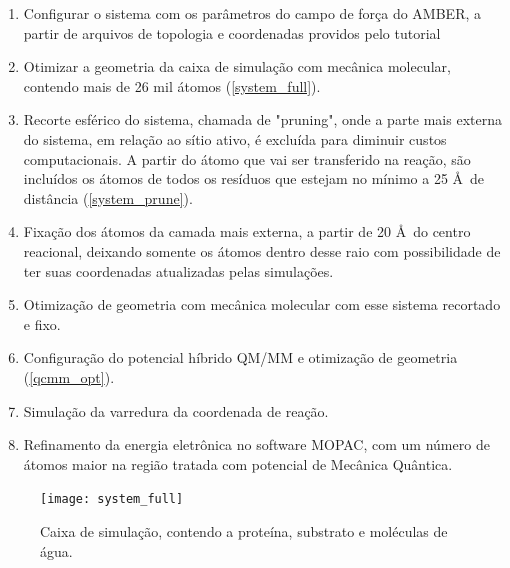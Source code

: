 \documentclass[a4paper,11pt]{refart}
\begin{document}
	\begin{enumerate}
		\item Configurar o sistema com os parâmetros do campo de força do AMBER, a partir de arquivos de topologia e coordenadas providos pelo tutorial
		\item Otimizar a geometria da caixa de simulação com mecânica molecular, contendo mais de 26 mil átomos (\autoref{system_full}). 
		\item Recorte esférico do sistema, chamada de "pruning", onde a parte mais externa do sistema, em relação ao sítio ativo, é excluída para diminuir custos computacionais. A partir do átomo que vai ser transferido na reação, são incluídos os átomos de todos os resíduos que estejam no mínimo a 25 \AA\ de distância (\autoref{system_prune}). 
		\item Fixação dos átomos da camada mais externa, a partir de 20 \AA\ do centro reacional, deixando somente os átomos dentro desse raio com possibilidade de ter suas coordenadas atualizadas pelas simulações. 
		\item Otimização de geometria com mecânica molecular com esse sistema recortado e fixo.
		\item Configuração do potencial híbrido QM/MM e otimização de geometria (\autoref{qcmm_opt}).
		\item Simulação da varredura da coordenada de reação. 
		\item Refinamento da energia eletrônica no software MOPAC, com um número de átomos maior na região tratada com potencial de Mecânica Quântica.		
	\end{enumerate}

	\hspace*{-\leftmarginwidth}
	\begin{minipage}{\fullwidth}
		\begin{figure}[H]
			\begin{center}
				\texttt{[image: system\_full]}
				\caption{Caixa de simulação, contendo a proteína, substrato e moléculas de água.}
				\label{system_full}
			\end{center}
		\end{figure}
	\end{minipage}
	
\end{document}
